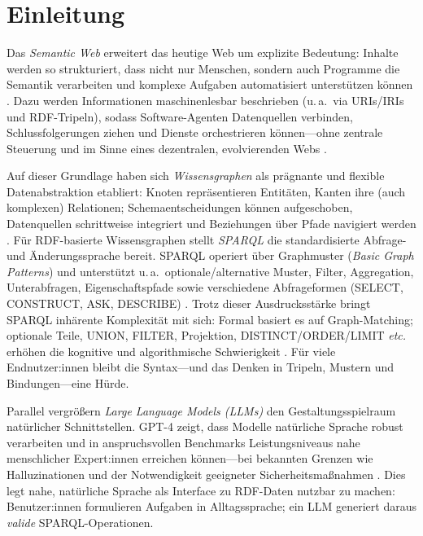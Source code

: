 

\chapter{Einleitung}\label{sec:Einleitung}

Das \emph{Semantic Web} erweitert das heutige Web um explizite Bedeutung: Inhalte werden so strukturiert, dass nicht nur Menschen, sondern auch Programme die Semantik verarbeiten und komplexe Aufgaben automatisiert unterstützen können \cite{bernersLee2001}. Dazu werden Informationen maschinenlesbar beschrieben (u.\,a.\ via URIs/IRIs und RDF-Tripeln), sodass Software-Agenten Datenquellen verbinden, Schlussfolgerungen ziehen und Dienste orchestrieren können—ohne zentrale Steuerung und im Sinne eines dezentralen, evolvierenden Webs \cite{bernersLee2001}.

Auf dieser Grundlage haben sich \emph{Wissensgraphen} als prägnante und flexible Datenabstraktion etabliert: Knoten repräsentieren Entitäten, Kanten ihre (auch komplexen) Relationen; Schemaentscheidungen können aufgeschoben, Datenquellen schrittweise integriert und Beziehungen über Pfade navigiert werden \cite{hogan2021}. Für RDF-basierte Wissensgraphen stellt \emph{SPARQL} die standardisierte Abfrage- und Änderungs\-sprache bereit. SPARQL operiert über Graphmuster (\emph{Basic Graph Patterns}) und unterstützt u.\,a.\ optionale/alternative Muster, Filter, Aggregation, Unterabfragen, Eigenschaftspfade sowie verschiedene Abfrageformen (SELECT, CONSTRUCT, ASK, DESCRIBE) \cite{w3cSparql11}. Trotz dieser Ausdrucksstärke bringt SPARQL inhärente Komplexität mit sich: Formal basiert es auf Graph-Matching; optionale Teile, UNION, FILTER, Projektion, DISTINCT/ORDER/LIMIT \emph{etc.} erhöhen die kognitive und algorithmische Schwierigkeit \cite{perezGutierrezSparql}. Für viele Endnutzer:innen bleibt die Syntax—und das Denken in Tripeln, Mustern und Bindungen—eine Hürde.

Parallel vergrößern \emph{Large Language Models (LLMs)} den Gestaltungsspielraum natürlicher Schnittstellen. GPT-4 zeigt, dass Modelle natürliche Sprache robust verarbeiten und in anspruchsvollen Benchmarks Leistungsniveaus nahe menschlicher Expert:innen erreichen können—bei bekannten Grenzen wie Halluzinationen und der Notwendigkeit geeigneter Sicherheitsmaßnahmen \cite{openaiGPT42023}. Dies legt nahe, natürliche Sprache als Interface zu RDF-Daten nutzbar zu machen: Benutzer:innen formulieren Aufgaben in Alltagssprache; ein LLM generiert daraus \emph{valide} SPARQL-Operationen.

